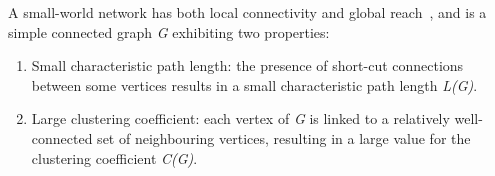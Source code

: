 \documentclass[twocolumn]{svjour3}          %
\theoremstyle{definition}
\begin{document}
\begin{table}[htb]
\caption{Network measures for Gangs A, B, C, D. CC is the  average clustering coefficient from~\cite{WattsStrogatz1998}, considering only 1-neighbourhood.}
\label{tab:networkmeasuresgang}
\end{table}

A small-world network has both local connectivity and global
reach~\citep{WattsStrogatz1998}, and is a simple connected graph
\emph{G} exhibiting two properties:

\begin{enumerate}
\item Small characteristic path length: the presence of short-cut
connections between some vertices results in a small characteristic
path length \emph{L(G)}.
\item Large clustering coefficient: each vertex of \emph{G} is linked
to a relatively well-connected set of neighbouring vertices, resulting
in a large value for the clustering coefficient \emph{C(G)}.
\end{enumerate}
 
\end{document}
